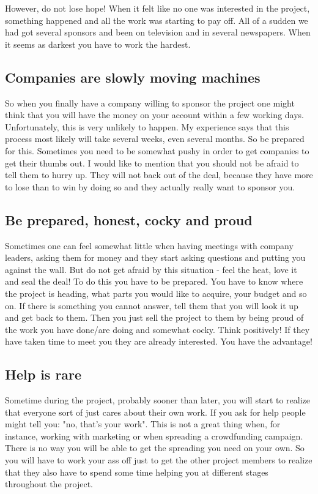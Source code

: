 However, do not lose hope! When it felt like no one was interested in the project, something happened and all the work was starting to pay off. All of a sudden we had got several sponsors and been on television and in several newspapers. When it seems as darkest you have to work the hardest.

\subsection{Companies are slowly moving machines}
So when you finally have a company willing to sponsor the project one might think that you will have the money on your account within a few working days. Unfortunately, this is very unlikely to happen. My experience says that this process most likely will take several weeks, even several months. So be prepared for this. Sometimes you need to be somewhat pushy in order to get companies to get their thumbs out. I would like to mention that you should not be afraid to tell them to hurry up. They will not back out of the deal, because they have more to lose than to win by doing so and they actually really want to sponsor you.

\subsection{Be prepared, honest, cocky and proud}
Sometimes one can feel somewhat little when having meetings with company leaders, asking them for money and they start asking questions and putting you against the wall. But do not get afraid by this situation - feel the heat, love it and seal the deal! To do this you have to be prepared. You have to know where the project is heading, what parts you would like to acquire, your budget and so on. If there is something you cannot answer, tell them that you will look it up and get back to them. Then you just sell the project to them by being proud of the work you have done/are doing and somewhat cocky.  Think positively! If they have taken time to meet you they are already interested. You have the advantage!

\subsection{Help is rare}
Sometime during the project, probably sooner than later, you will start to realize that everyone sort of just cares about their own work. If you ask for help people might tell you: "no, that's your work". This is not a great thing when, for instance,  working with marketing or when spreading a crowdfunding campaign. There is no way you will be able to get the spreading you need on your own. So you will have to work your ass off just to get the other project members to realize that they also have to spend some time helping you at different stages throughout the project. 

